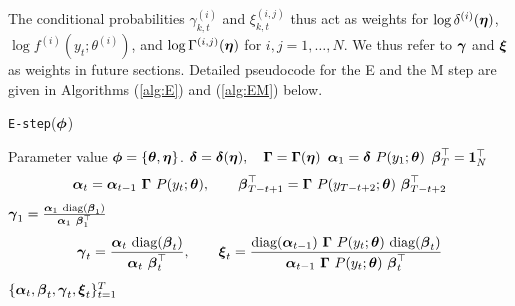 %
The conditional probabilities $\gamma_{k,t}^{(i)}$ and $\xi_{k,t}^{(i,j)}$ thus act as weights for $\log \delta^{(i)}(\boldsymbol{\eta})$, $\log f^{(i)}(y_t;\theta^{(i)})$, and $\log \Gamma^{(i,j)}(\boldsymbol{\eta})$ for $i,j = 1,\ldots,N$. We thus refer to $\boldsymbol{\gamma}$ and $\boldsymbol{\xi}$ as weights in future sections. Detailed pseudocode for the E and the M step are given in Algorithms (\ref{alg:E}) and (\ref{alg:EM}) below.
%
\begin{algorithm}
\caption{\texttt{E-step}($\boldsymbol{\phi}$)}\label{alg:E}
\begin{algorithmic}[1]
\Require Parameter value $\boldsymbol{\phi} = \{\boldsymbol{\theta},\boldsymbol{\eta}\}$.
%
\State $\boldsymbol{\delta} = \boldsymbol{\delta}(\boldsymbol{\eta}), \quad \boldsymbol{\Gamma} = \boldsymbol{\Gamma}(\boldsymbol{\eta})$
\State $\boldsymbol{\alpha}_1 = \boldsymbol{\delta} ~ P(y_1;\boldsymbol{\theta})$
\State $\boldsymbol{\beta}^\top_T = \mathbf{1}_N^\top$
    \State $$\boldsymbol{\alpha}_t = \boldsymbol{\alpha}_{t-1} ~ \boldsymbol{\Gamma} ~ P(y_t;\boldsymbol{\theta}), \qquad \boldsymbol{\beta}^\top_{T-t+1} = \boldsymbol{\Gamma} ~ P(y_{T-t+2};\boldsymbol{\theta}) ~ \boldsymbol{\beta}^\top_{T-t+2}$$
\EndFor
%
\State $\boldsymbol{\gamma}_1 = \frac{\boldsymbol{\alpha}_1 ~ \text{diag}(\boldsymbol{\beta}_1)}{\boldsymbol{\alpha}_1 ~ \boldsymbol{\beta}_1^\top}$
%
    \State $$\boldsymbol{\gamma}_t = \frac{\boldsymbol{\alpha}_t ~ \text{diag}(\boldsymbol{\beta}_t)}{\boldsymbol{\alpha}_t ~ \boldsymbol{\beta}_t^\top}, \qquad \boldsymbol{\xi}_t = \frac{\text{diag}(\boldsymbol{\alpha}_{t-1}) ~ \boldsymbol{\Gamma} ~ P(y_t;\boldsymbol{\theta}) ~ \text{diag}(\boldsymbol{\beta}_t)}{\boldsymbol{\alpha}_{t-1} ~ \boldsymbol{\Gamma} ~ P(y_{t};\boldsymbol{\theta}) ~ \boldsymbol{\beta}_{t}^\top}$$
\EndFor
%
\State \Return $\{\boldsymbol{\alpha}_t,\boldsymbol{\beta}_t,\boldsymbol{\gamma}_t,\boldsymbol{\xi}_t\}_{t=1}^T$
\end{algorithmic}
\end{algorithm}
